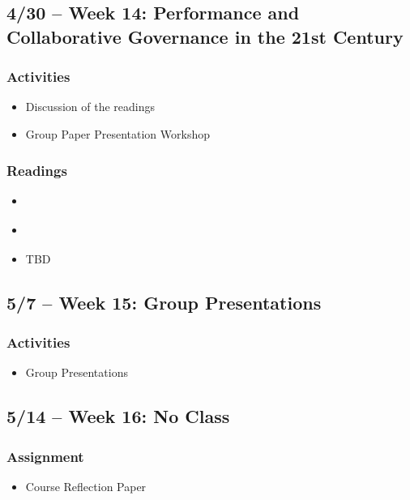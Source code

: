\documentclass[12pt, letterpaper]{article}
\begin{document}
\subsection*{4/30 -- Week 14: Performance and Collaborative Governance in the 21st Century}
    \subsubsection*{Activities}
        \begin{itemize}
            \item Discussion of the readings
            \item Group Paper Presentation Workshop
        \end{itemize}
    \subsubsection*{Readings}
        \begin{itemize}
            \item \citet[chapters 10--12]{Agranoff2023}
            \item \citet[chapter 10]{Henderson2015}
            \item TBD
        \end{itemize}


\subsection*{5/7 -- Week 15: Group Presentations}
    \subsubsection*{Activities}
        \begin{itemize}
            \item Group Presentations
        \end{itemize}

\subsection*{5/14 -- Week 16: No Class}
    \subsubsection*{Assignment}
        \begin{itemize}
            \item Course Reflection Paper
        \end{itemize}
\end{document}
